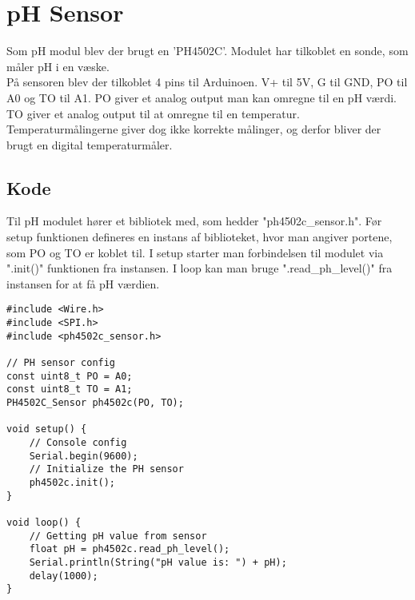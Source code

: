 \section{pH Sensor}
	Som pH modul blev der brugt en 'PH4502C'. Modulet har tilkoblet en sonde, som måler pH i en væske. \\ [7pt]
	På sensoren blev der tilkoblet 4 pins til Arduinoen. V+ til 5V, G til GND, PO til A0 og TO til A1. PO giver et analog output man kan omregne til en pH værdi. TO giver et analog output til at omregne til en temperatur. Temperaturmålingerne giver dog ikke korrekte målinger, og derfor bliver der brugt en digital temperaturmåler.
	\subsection{Kode}
		Til pH modulet hører et bibliotek med, som hedder "ph4502c\_sensor.h". Før setup funktionen defineres en instans af biblioteket, hvor man angiver portene, som PO og TO er koblet til. I setup starter man forbindelsen til modulet via ".init()"{} funktionen fra instansen. I loop kan man bruge ".read\_ph\_level()"{} fra instansen for at få pH værdien.
		\begin{lstlisting}
#include <Wire.h>
#include <SPI.h>
#include <ph4502c_sensor.h>

// PH sensor config
const uint8_t PO = A0;
const uint8_t TO = A1;
PH4502C_Sensor ph4502c(PO, TO);

void setup() {
	// Console config
	Serial.begin(9600);
	// Initialize the PH sensor
	ph4502c.init();
}

void loop() {
	// Getting pH value from sensor
	float pH = ph4502c.read_ph_level();
	Serial.println(String("pH value is: ") + pH);
	delay(1000);
}
		\end{lstlisting}